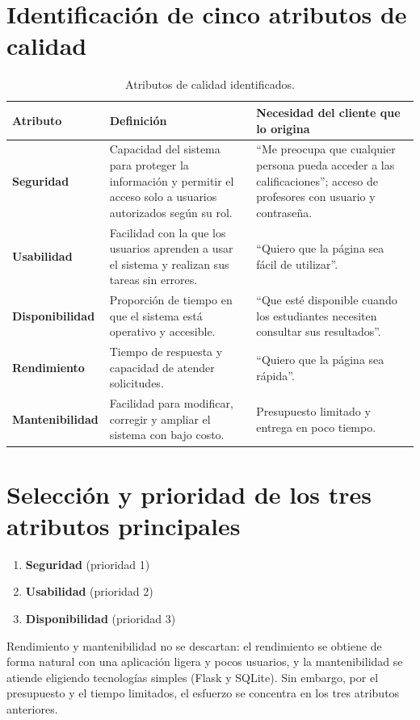 \documentclass[11pt,letterpaper]{article}
\begin{document}
\section{Identificación de cinco atributos de calidad}

\begin{table}[H]
\centering
\begin{tabularx}{\textwidth}{>{\bfseries}l Y Y}
\toprule
{}
Atributo & Definición & Necesidad del cliente que lo origina \\
\midrule
Seguridad & Capacidad del sistema para proteger la información y permitir el acceso
solo a usuarios autorizados según su rol. &
``Me preocupa que cualquier persona pueda acceder a las calificaciones''; acceso de
profesores con usuario y contraseña. \\
Usabilidad & Facilidad con la que los usuarios aprenden a usar el sistema y realizan
sus tareas sin errores. & ``Quiero que la página sea fácil de utilizar''. \\
Disponibilidad & Proporción de tiempo en que el sistema está operativo y accesible. &
``Que esté disponible cuando los estudiantes necesiten consultar sus resultados''. \\
Rendimiento & Tiempo de respuesta y capacidad de atender solicitudes. &
``Quiero que la página sea rápida''. \\
Mantenibilidad & Facilidad para modificar, corregir y ampliar el sistema con bajo
costo. & Presupuesto limitado y entrega en poco tiempo. \\
\bottomrule
\end{tabularx}
\caption{Atributos de calidad identificados.}
\end{table}

\section{Selección y prioridad de los tres atributos principales}

\begin{enumerate}[leftmargin=*]
  \item \textbf{Seguridad} (prioridad 1)
  \item \textbf{Usabilidad} (prioridad 2)
  \item \textbf{Disponibilidad} (prioridad 3)
\end{enumerate}

Rendimiento y mantenibilidad no se descartan: el rendimiento se obtiene de forma
natural con una aplicación ligera y pocos usuarios, y la mantenibilidad se atiende
eligiendo tecnologías simples (Flask y SQLite). Sin embargo, por el presupuesto y el
tiempo limitados, el esfuerzo se concentra en los tres atributos anteriores.
\end{document}
